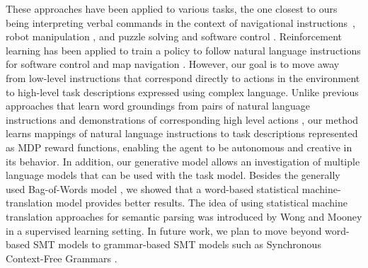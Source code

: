 \documentclass[conference]{IEEEtran}
\begin{document}
These approaches have been applied to various tasks, the one  closest to ours being interpreting verbal commands in the context of navigational instructions~\cite{vogel10,mooney11,grubb11}, robot manipulation \cite{duvallet2013,tellex14},
and puzzle solving and software control \cite{bkr10}.
 Reinforcement learning has been applied to train a policy to follow natural language instructions for software control
and map navigation \cite{vogel10}. However, our goal is to move away from low-level instructions that correspond directly to actions in the environment
to high-level task descriptions expressed using complex language. 
Unlike previous approaches that learn word groundings from pairs of natural language instructions and demonstrations of corresponding high level actions
\cite{tellex14,duvallet2013},
our method learns mappings of natural language instructions to task descriptions represented as MDP reward functions, enabling the agent to be autonomous and creative in its behavior. In addition, our generative model allows an investigation of multiple language models that can be used with the task model. Besides the generally used Bag-of-Words model \cite{bkr09,vogel10}, we showed that a word-based statistical machine-translation model provides better results. The idea of using statistical machine translation approaches for semantic parsing was introduced by Wong and Mooney \cite{wong07} in a supervised learning setting. In future work, we plan to move beyond word-based SMT models to grammar-based SMT models such as Synchronous Context-Free Grammars \cite{Wu1997}. 


\end{document}

